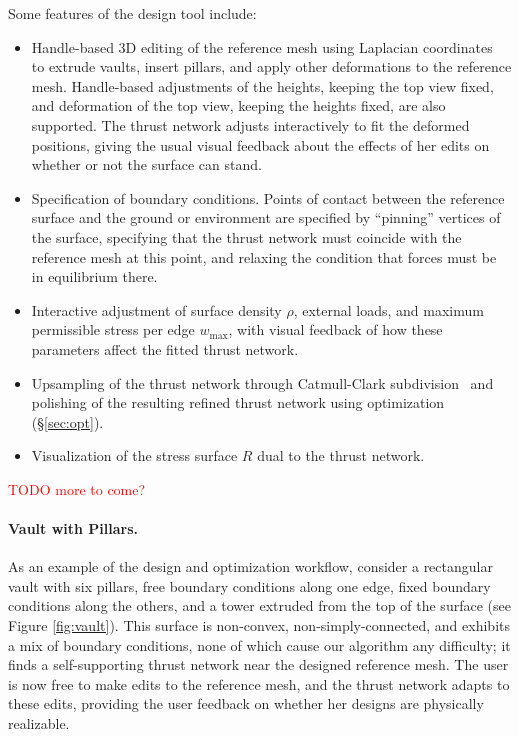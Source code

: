 \documentclass[annual]{acmsiggraph}
\newcommand{\todo}[1]{\textcolor{red}{#1}}
\newcommand{\secref}[1]{(\S\ref{#1})}
\begin{document}
Some features of the design tool include:

\begin{itemize}

\item Handle-based 3D editing of the reference mesh using Laplacian 
coordinates~\cite{Lipman2004,Sorkine2003} to extrude vaults, insert 
pillars, and apply other deformations to the reference mesh. Handle-based 
adjustments of the heights, keeping the top view fixed, and deformation of 
the top view, keeping the heights fixed, are also supported. The thrust 
network adjusts interactively to fit the deformed positions, giving the 
usual visual feedback about the effects of her edits on whether or not the 
surface can stand.

\item Specification of boundary conditions. Points of contact between the 
reference surface and the ground or environment are specified by 
``pinning'' vertices of the surface, specifying that the thrust network 
must coincide with the reference mesh at this point, and relaxing the 
condition that forces must be in equilibrium there.

\item Interactive adjustment of surface density $\rho$, external loads, 
and maximum permissible stress per edge $w_{\textrm{max}}$, with visual 
feedback of how these parameters affect the fitted thrust network.

\item Upsampling of the thrust network through Catmull-Clark 
subdivision~\cite{TODO} and polishing of the resulting refined thrust 
network using optimization \secref{sec:opt}.

\item Visualization of the stress surface $R$ dual to the thrust network.

\end{itemize}

\todo{TODO more to come?}


\paragraph{Vault with Pillars.} As an example of the design and optimization workflow, consider a rectangular vault with six pillars, free boundary conditions along one edge, fixed boundary conditions along the others, and a tower extruded from the top of the surface (see Figure \ref{fig:vault}). This surface is non-convex, non-simply-connected, and exhibits a mix of boundary conditions, none of which cause our algorithm any difficulty; it finds a self-supporting thrust network near the designed reference mesh. The user is now free to make edits to the reference mesh, and the thrust network adapts to these edits, providing the user feedback on whether her designs are physically realizable. 
\end{document}
